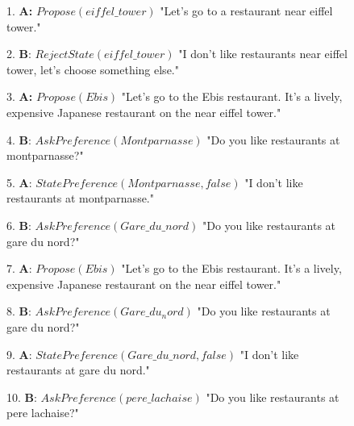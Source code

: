 	\begin{figure}[!t]
	\begin{minipage}{\textwidth}
			{\ttfamily
				\begin{addmargin}[1em]{2em}%
					\vspace{0.5 em}
					1. \textbf{A:} $Propose(eiffel\_tower)$ "Let's go to a restaurant near \hspace*{3mm} eiffel tower."
					
					
					2. \hspace*{3mm}\textbf{B}: $RejectState(eiffel\_tower)$ "I don't like restaurants \hspace*{4mm} near eiffel tower, let's choose something else."
					
					
					3. \textbf{A:} $Propose(Ebis)$ "Let's go to the Ebis restaurant. It's \hspace*{3mm} a lively, expensive Japanese restaurant on the near \hspace*{3mm} eiffel tower."
					
					
					4. \hspace*{3mm}\textbf{B}: $AskPreference(Montparnasse)$ "Do you like \hspace*{4mm} restaurants at montparnasse?"
					
					
					5. \textbf{A}: $StatePreference(Montparnasse,false)$ "I don't like \hspace*{3mm} restaurants at montparnasse."
					
					
					6. \hspace*{3mm}\textbf{B}: $AskPreference(Gare\_du\_nord)$ "Do you like restaurants \hspace*{4mm} at gare du nord?"
					
					
					7. \textbf{A}: $Propose(Ebis)$ "Let's go to the Ebis restaurant. It's \hspace*{3mm} a lively, expensive Japanese restaurant on the near \hspace*{3mm} eiffel tower."
					
					
					8. \hspace*{3mm}\textbf{B}: $AskPreference(Gare\_du_nord)$ "Do you like restaurants \hspace*{4mm} at gare du nord?"
					
					
					9. \textbf{A}: $StatePreference(Gare\_du\_nord,false)$ "I don't like \hspace*{3mm} restaurants at gare du nord."
					
					
					10. \hspace*{3mm}\textbf{B}: $AskPreference(pere\_lachaise)$ "Do you like restaurants \hspace*{4mm} at pere lachaise?"
					

\end{addmargin}}
\end{minipage}
\end{figure}
